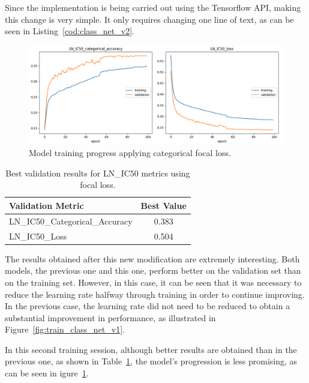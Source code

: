 Since the implementation is being carried out using the Tensorflow API, making this change is very simple. It only requires changing one line of text, as can be seen in Listing~\ref{cod:class_net_v2}.

\begin{figure}[H]
    \centering
    \includegraphics[width=1\textwidth]{figures/neural_net_classification/classification_mse_v2.png}
    \caption{Model training progress applying categorical focal loss.}
    \label{fig:train_class_net_v2}
\end{figure}

\begin{table}[H]
    \centering
    \begin{tabular}{|l|c|}
    \hline
    \textbf{Validation Metric} & \textbf{Best Value} \\
    \hline
    LN\_IC50\_Categorical\_Accuracy & 0.383 \\
    LN\_IC50\_Loss & 0.504 \\
    \hline
    \end{tabular}
    \caption{Best validation results for LN\_IC50 metrics using focal loss.}
    \label{tab:best_val_ln_ic50_focal}
\end{table}

The results obtained after this new modification are extremely interesting. Both models, the previous one and this one, perform better on the validation set than on the training set. However, in this case, it can be seen that it was necessary to reduce the learning rate halfway through training in order to continue improving. In the previous case, the learning rate did not need to be reduced to obtain a substantial improvement in performance, as illustrated in Figure~\ref{fig:train_class_net_v1}. 

In this second training session, although better results are obtained than in the previous one, as shown in Table~\ref{tab:best_val_ln_ic50_focal}, the model's progression is less promising, as can be seen in igure~\ref{fig:train_class_net_v2}.

